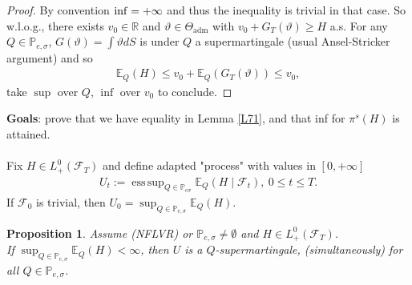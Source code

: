 \documentclass[12pt,a4paper, twoside]{article}
\newtheorem{prop}{Proposition}[section]
\theoremstyle{definition}
\newcommand{\EE}{\mathbb{E}} %
\newcommand{\PP}{\mathbb{P}} %
\DeclareMathOperator*{\esssup}{ess\,sup}
\begin{document}
\begin{proof}
By convention $\inf \empty = + \infty$ and thus the inequality is trivial in that case. So w.l.o.g., there exists $v_0 \in \mathbb{R}$ and $\vartheta \in \Theta_\text{adm}$ with $v_0 + G_T( \vartheta) \geq H$ a.s. For any $Q \in \PP_{e, \sigma}$, $G( \vartheta) = \int \vartheta dS$ is under $Q$ a supermartingale (usual Ansel-Stricker argument) and so 
\begin{align*}
\EE_Q(H) \leq v_0+ \EE_Q( G_T( \vartheta)) \leq v_0,
\end{align*}
take $\sup$ over $Q$, $\inf$ over $v_0$ to conclude. 
\end{proof}
\newpage
\noindent \textbf{Goals}: prove that we have equality in Lemma \ref{L71}, and that inf for $\pi^s(H)$ is attained. 
\\\\
Fix $H \in L_+^0( \mathcal{F}_T)$ and define adapted "process" with values in $[0, + \infty]$ 
\begin{align*}
U_t := \esssup_{Q \in \PP_{e \sigma}} \EE_Q(H \mid \mathcal{F}_t), \ 0 \leq t \leq T.
\end{align*}
If $\mathcal{F}_0$ is trivial, then $U_0 = \sup_{Q \in \PP_{e, \sigma}} \EE_Q(H).$
\begin{prop} \label{P72} Assume (NFLVR) or $\PP_{e, \sigma} \neq \emptyset$ and $H \in L_+^0( \mathcal{F}_T)$. \\ If $\sup_{Q \in \PP_{e, \sigma}} \EE_Q(H) < \infty$, then $U$ is a $Q$-supermartingale, (simultaneously) for all $Q \in \PP_{e, \sigma}$. 
\end{prop}
\end{document}
